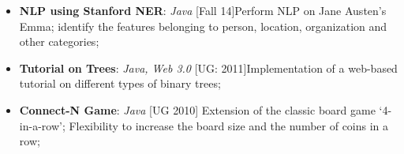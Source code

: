 \documentclass[11pt]{article}
\begin{document}
\begin{multicols}{2}
\begin{itemize}[nolistsep,leftmargin=*]
				\item \textbf{NLP using Stanford NER}: \textit{Java} \hfill[Fall 14]\newline Perform NLP on Jane Austen's Emma; identify the features belonging to person, location, organization and other categories; 
				\item \textbf{Tutorial on Trees}: \textit{Java, Web 3.0} \hfill[UG: 2011]\newline Implementation of a web-based tutorial on different types of binary trees; 
				\item \textbf{Connect-N Game}: \textit{Java} \hfill [UG 2010] Extension of the classic board game `4-in-a-row'; Flexibility to increase the board size and the number of coins in a row;
			\end{itemize}
		
	\end{multicols}
\end{document}
